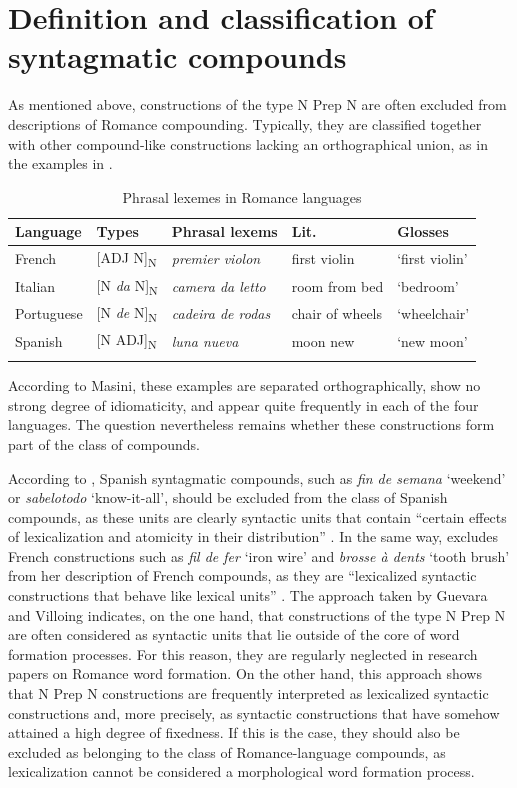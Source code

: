 \documentclass[output=paper]{langsci/langscibook}
\begin{document}
\section{Definition and classification of syntagmatic compounds} 

As mentioned above, constructions of the type N Prep N are often excluded from descriptions of Romance compounding.  Typically, they are classified together with other compound-like constructions lacking an orthographical union, as in the examples in . 

\begin{table}
\caption{Phrasal lexemes in Romance languages \citep[257]{Masini:2009}\label{Fig:1:Types of phrasal lexemes}}
\begin{tabular}{lllll}
\lsptoprule 
Language & Types & Phrasal lexems & Lit. & Glosses\\ 
\midrule
French & [ADJ N]\textsubscript{N} & \textit{premier violon} & first violin & `first violin' \\  
Italian & [N \textit{da} N]\textsubscript{N} & \textit{camera da letto} & room from bed & `bedroom' \\  
Portuguese & [N \textit{de} N]\textsubscript{N} & \textit{cadeira de rodas} & chair of wheels & `wheelchair' \\  
Spanish & [N ADJ]\textsubscript{N} & \textit{luna nueva} & moon new & `new moon' \\ 
\lspbottomrule
\end{tabular} 
\end{table}

According to Masini, these examples are separated orthographically, show no strong degree of idiomaticity, and appear quite frequently in each of the four languages. The question nevertheless remains whether these constructions form part of the class of compounds.

According to \citet{Guevara:2012}, Spanish syntagmatic compounds, such as \textit{fin de semana} `weekend' or \textit{sabelotodo} `know-it-all', should be excluded from the class of Spanish compounds, as these units are clearly syntactic units that contain “certain effects of lexicalization and atomicity in their distribution” \citep[180]{Guevara:2012}. In the same way, \citet{Villoing:2012} excludes French constructions such as \textit {fil de fer} `iron wire' and \textit {brosse à dents} `tooth brush' from her description of French compounds, as they are “lexicalized syntactic constructions that behave like lexical units” \citep[35]{Villoing:2012}. The approach taken by Guevara and Villoing indicates, on the one hand, that constructions of the type N Prep N are often considered as syntactic units that lie outside of the core of word formation processes. For this reason, they are regularly neglected in research papers on Romance word formation. On the other hand, this approach shows that N Prep N constructions are frequently interpreted as lexicalized syntactic constructions and, more precisely, as syntactic constructions that have somehow attained a high degree of fixedness. If this is the case, they should also be excluded as belonging to the class of Romance-language compounds, as lexicalization cannot be considered a morphological word formation process.
\end{document}
